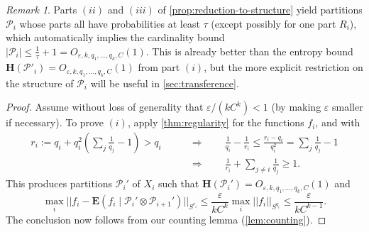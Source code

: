 \documentclass[reqno,11pt]{amsart}
\theoremstyle{definition}
\theoremstyle{remark}
\newtheorem*{remark}{Remark}
\numberwithin{equation}{section}
\renewcommand{\H}{\mathbf{H}}
\newcommand{\E}{\mathbf{E}}
\newcommand{\mP}{\mathcal{P}}
\newcommand{\eps}{\varepsilon}
\begin{document}
\begin{remark}
Parts $(ii)$ and $(iii)$ of \cref{prop:reduction-to-structure} yield partitions $\mP_i$ whose parts all have probabilities at least $\tau$ (except possibly for one part $R_i$), which automatically implies the cardinality bound $|\mP_i| \le \frac{1}{\tau} + 1 = O_{\eps,k,q_1, \ldots, q_k,C}(1)$. This is already better than the entropy bound $\H(\mP'_i) = O_{\eps,k,q_1, \ldots, q_k,C}(1)$ from part $(i)$, but the more explicit restriction on the structure of $\mP_i$ will be useful in \cref{sec:transference}.
\end{remark}


\begin{proof}
Assume without loss of generality that $\eps/(kC^k) < 1$ (by making $\eps$ smaller if necessary).
To prove $(i)$, apply \cref{thm:regularity} for the functions $f_{i}$, and with
\begin{equation} \label{eq:r-choice}
\begin{aligned}
    r_i := q_i + q_i^2\left(\sum_j \frac{1}{q_j}-1\right) > q_i
    \qquad 
    &\Rightarrow 
    \qquad 
    \frac{1}{q_i} - \frac{1}{r_i} \le \frac{r_i - q_i}{q_i^2} = \sum_j \frac{1}{q_j}-1
    \\
    &\Rightarrow 
    \qquad 
    \frac{1}{r_i} + \sum_{j \neq i} \frac{1}{q_j} \ge 1.
\end{aligned}
\end{equation}
This produces partitions $\mP_i'$ of $X_i$ such that $\H(\mP_i') = O_{\eps,k,q_1, \ldots, q_k,C}(1)$ and 
\[
    \max_i ||f_{i} - \E(f_{i} \mid \mP_i' \otimes \mP_{i+1}')||_{S^{r_i}} \le \frac{\eps}{kC^k} \max_i ||f_{i}||_{S^{q_i}} \le \frac{\eps}{kC^{k-1}}.
\]
The conclusion now follows from our counting lemma (\cref{lem:counting}).


\end{proof}
\end{document}

